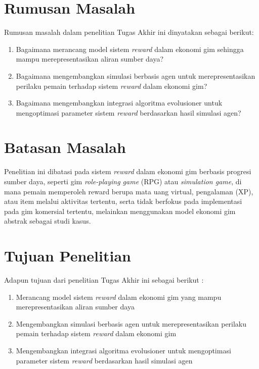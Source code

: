 \section{Rumusan Masalah}
\label{sec:problem}

Rumusan masalah dalam penelitian Tugas Akhir ini dinyatakan sebagai berikut:

\begin{enumerate}

     \item Bagaimana merancang model sistem \textit{reward} dalam ekonomi gim sehingga mampu merepresentasikan aliran sumber daya?

     \item Bagaimana mengembangkan simulasi berbasis agen untuk merepresentasikan perilaku pemain terhadap sistem \textit{reward} dalam ekonomi gim?

    \item Bagaimana mengembangkan integrasi algoritma evolusioner untuk mengoptimasi parameter sistem \textit{reward} berdasarkan hasil simulasi agen?
    
    
\end{enumerate}

\section{Batasan Masalah}
\label{sec:limitation}

Penelitian ini dibatasi pada sistem \textit{reward} dalam ekonomi gim berbasis progresi sumber daya, seperti gim \textit{role-playing game} (RPG) atau \textit{simulation game}, di mana pemain memperoleh reward berupa mata uang virtual, pengalaman (XP), atau item melalui aktivitas tertentu, serta tidak berfokus pada implementasi pada gim komersial tertentu, melainkan menggunakan model ekonomi gim abstrak sebagai studi kasus.

\section{Tujuan Penelitian}
\label{sec:purpose}

Adapun tujuan dari penelitian Tugas Akhir ini sebagai berikut : 
     \begin{enumerate}

         \item Merancang model sistem \textit{reward} dalam ekonomi gim yang mampu merepresentasikan aliran sumber daya

         \item Mengembangkan simulasi berbasis agen untuk merepresentasikan perilaku pemain terhadap sistem \textit{reward} dalam ekonomi gim

         \item Mengembangkan integrasi algoritma evolusioner untuk mengoptimasi parameter sistem \textit{reward} berdasarkan hasil simulasi agen
        
     \end{enumerate}

